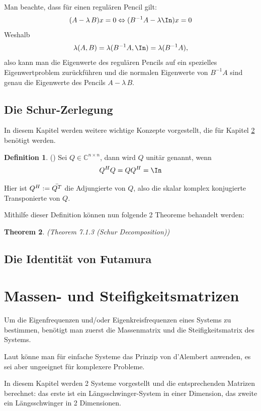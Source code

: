 \documentclass[a4paper,12pt]{report}
\newcommand{\C}{\mathbb C}
\newcommand{\AlamB}{A-\lambda\,B}
\theoremstyle{plain} %
\newtheorem{theorem}{Theorem}
\theoremstyle{definition} %
\newtheorem{definition}[theorem]{Definition}
\theoremstyle{remark}
\begin{document}
            Man beachte, dass für einen regulären Pencil gilt:
            $$(\AlamB)x = 0 \Leftrightarrow (B^{-1}A - \lambda \In)x = 0$$
            Weshalb $$\lambda(A,B) = \lambda(B^{-1}A,\In) = \lambda(B^{-1}A),$$
            also kann man die Eigenwerte des regulären Pencils auf ein spezielles Eigenwertproblem zurückführen und die normalen Eigenwerte von $B^{-1}A$ sind genau die Eigenwerte des Pencils $\AlamB$.
      \section{Die Schur-Zerlegung}
            In diesem Kapitel werden weitere wichtige Konzepte vorgestellt, die für Kapitel \ref{sec: Futamura} benötigt werden.

            \begin{definition}(\cite[S. 73]{matrixGolub})
                  Sei $Q \in\C^{n\times n}$, dann wird $Q$ unitär genannt, wenn
                  $$Q^HQ = QQ^H=\In$$
            \end{definition}
            Hier ist $Q^H := \Bar{Q^T}$ die Adjungierte von $Q$, also die skalar komplex konjugierte Transponierte von $Q$.

            Mithilfe dieser Definition können nun folgende 2 Theoreme behandelt werden:
            \begin{theorem}(Theorem 7.1.3 (Schur Decomposition)\cite[S. 313]{matrixGolub})
                  \label{thrm: Schur Zerlegung}

            \end{theorem}

      
      \section{Die Identität von Futamura}
      \label{sec: Futamura}
\chapter{Massen- und Steifigkeitsmatrizen}
\label{sec: MS Matrizen}
      Um die Eigenfrequenzen und/oder Eigenkreisfrequenzen \w eines Systems zu bestimmen, benötigt man zuerst die Massenmatrix \M und die Steifigkeitsmatrix \K des Systems.

      Laut \cite[S. 366]{maschinendynamikDresig} könne man für einfache Systeme das Prinzip von d'Alembert anwenden, es sei aber ungeeignet für komplexere Probleme.
            
      In diesem Kapitel werden 2 Systeme vorgestellt und die entsprechenden Matrizen berechnet:
      das erste ist ein Längsschwinger-System in einer Dimension, das zweite ein Längsschwinger in 2 Dimensionen.
\end{document}
